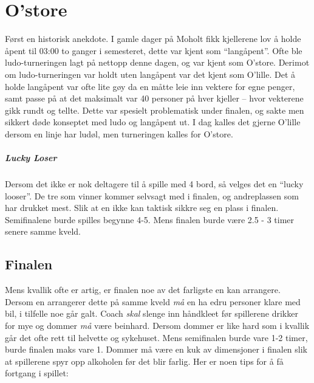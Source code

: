 \documentclass[10pt,a4paper,norsk,openany]{book}
\begin{document}
\chapter{O'store}
\label{chap:O-store}
Først en historisk anekdote. I gamle dager på Moholt fikk kjellerene lov å holde
åpent til 03:00 to ganger i semesteret, dette var kjent som ``langåpent''. Ofte
ble ludo-turneringen lagt på nettopp denne dagen, og var kjent som O'store.
Derimot om ludo-turneringen var holdt uten langåpent var det kjent som O'lille.
Det å holde langåpent var ofte lite gøy da en måtte leie inn vektere for egne
penger, samt passe på at det maksimalt var 40 personer på hver kjeller -- hvor
vekterene gikk rundt og tellte. Dette var spesielt problematisk under finalen,
og sakte men sikkert døde konseptet med ludo og langåpent ut. I dag kalles
det gjerne O'lille dersom en linje har ludøl, men turneringen kalles for
O'store.

\paragraph{Lucky Loser}

Dersom det ikke er nok deltagere til å spille med 4 bord, så velges det en
``lucky looser''. De tre som vinner kommer selvsagt med i finalen, og
andreplassen som har drukket mest. Slik at en ikke kan taktisk sikkre seg en
plass i finalen. Semifinalene burde spilles begynne 4-5. Mens finalen burde være
2.5 - 3 timer senere samme kveld. 

\section{Finalen}

Mens kvallik ofte er artig, er finalen noe av det farligste en kan arrangere.
Dersom en arrangerer dette på samme kveld \emph{må} en ha edru personer klare
med bil, i tilfelle noe går galt. Coach \emph{skal} slenge inn håndkleet før
spillerene drikker for mye og dommer \emph{må} være beinhard. Dersom dommer er
like hard som i kvallik går det ofte rett til helvette og sykehuset. Mens
semifinalen burde vare 1-2 timer, burde finalen maks vare 1. Dommer må være en
kuk av dimensjoner i finalen slik at spillerene spyr opp alkoholen før det blir
farlig. Her er noen tips for å få fortgang i spillet:
\end{document}
